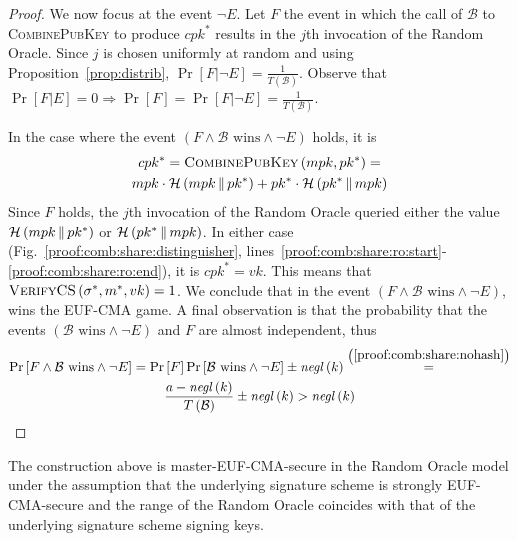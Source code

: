 \begin{proof}
      We now focus at the event $\neg E$. Let $F$ the event in which the call of
      $\mathcal{B}$ to \textsc{CombinePubKey} to produce $cpk^*$ results in the
      $j$th invocation of the Random Oracle. Since $j$ is chosen uniformly at
      random and using Proposition~\ref{prop:distrib}, $\Pr\left[F | \neg
      E\right] = \frac{1}{T\left(\mathcal{B}\right)}$. Observe that $\Pr\left[F
      | E\right] = 0 \Rightarrow \Pr\left[F\right] = \Pr\left[F | \neg E\right]
      = \frac{1}{T\left(\mathcal{B}\right)}$.

      In the case where the event $\left(F \wedge \mathcal{B} \text{ wins}
      \wedge \neg E\right)$ holds, it is
      \begin{gather*}
        cpk^* = \textsc{CombinePubKey}\left(mpk, pk^*\right) = \\
        mpk \cdot \mathcal{H}\left(mpk \,\|\, pk^*\right) + pk^* \cdot
        \mathcal{H}\left(pk^* \,\|\, mpk\right)
      \end{gather*}
      Since $F$ holds, the $j$th invocation of the Random Oracle queried either
      the value $\mathcal{H}\left(mpk \,\|\, pk^*\right)$ or
      $\mathcal{H}\left(pk^* \,\|\, mpk\right)$. In either case
      (Fig.~\ref{proof:comb:share:distinguisher},
      lines~\ref{proof:comb:share:ro:start}-\ref{proof:comb:share:ro:end}), it
      is $cpk^* = vk$. This means that $\textsc{VerifyCS}\left(\sigma^*, m^*,
      vk\right) = 1$. We conclude that in the event $\left(F \wedge \mathcal{B}
      \text{ wins} \wedge \neg E\right)$, \adversary{} wins the \textsf{EUF-CMA}
      game. A final observation is that the probability that the events
      $\left(\mathcal{B} \text{ wins} \wedge \neg E\right)$ and $F$ are almost
      independent, thus
      \begin{gather*}
        \Pr\left[F \wedge \mathcal{B} \text{ wins} \wedge \neg E\right] =
        \Pr\left[F\right] \Pr\left[\mathcal{B} \text{ wins} \wedge \neg E\right]
        \pm \mathit{negl}\left(k\right)
        \overset{\left(\ref{proof:comb:share:nohash}\right)}{=} \\
        \frac{a - \mathit{negl}\left(k\right)}{T\left(\mathcal{B}\right)} \pm
        \mathit{negl}\left(k\right) > \mathit{negl}\left(k\right)
      \end{gather*}
    \end{proof}

    \begin{lemma}
      \label{lemma:comb:master}
      The construction above is \textsf{master-EUF-CMA}-secure in the Random
      Oracle model under the assumption that the underlying signature scheme is
      strongly \textsf{EUF-CMA}-secure and the range of the Random Oracle
      coincides with that of the underlying signature scheme signing keys.
    \end{lemma}

